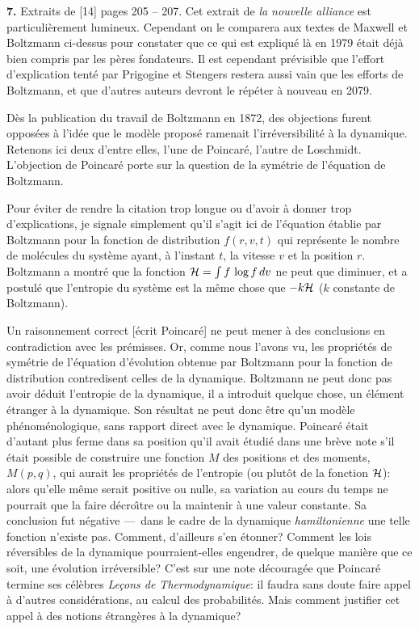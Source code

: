 \bigskip

{\bf 7.}\hskip3mm Extraits de [14] pages 205 -- 207. 
Cet extrait de {\it la nouvelle alliance} est particuli\`erement 
lumineux. Cependant on le comparera aux textes de Maxwell et 
Boltzmann ci-dessus pour constater que ce qui est expliqu\'e l\`a 
en 1979 \'etait d\'ej\`a bien compris par les p\`eres fondateurs. Il est 
cependant pr\'evisible que l'effort d'explication tent\'e par Prigogine et 
Stengers restera aussi vain que les efforts de Boltzmann, et que d'autres 
auteurs devront le r\'ep\'eter \`a nouveau en 2079. 
\medskip
{\cit D\`es la publication du travail de Boltzmann en {  1872},
des objections furent oppos\'ees \`a l'id\'ee que le mod\`ele propos\'e 
ramenait l'irr\'eversibilit\'e \`a la dynamique. Retenons ici deux d'entre 
elles, l'une de Poincar\'e, l'autre de Loschmidt. 
\smallskip
L'objection de Poincar\'e porte sur la question de la sym\'etrie de 
l'\'equation de Boltzmann. \par  }
\medskip
Pour \'eviter de rendre la citation trop longue ou d'avoir \`a donner trop 
d'explications, je signale simplement qu'il s'agit ici de l'\'equation 
\'etablie par Boltzmann pour la fonction de distribution $f(r,v,t)$ qui 
repr\'esente le nombre de mol\'ecules du syst\`eme ayant, \`a l'instant $t$, 
la vitesse $v$ et la position $r$. Boltzmann a montr\'e que la fonction 
${\cal H} = \int f\, \log f \, dv$ ne peut que diminuer, et a postul\'e 
que l'entropie du syst\`eme est la m\^eme chose que $-k{\cal H}$ ($k$ 
constante de Boltzmann). 
\medskip
{\cit  Un raisonnement correct [\'ecrit Poincar\'e] ne peut mener \`a des
conclusions en contradiction avec les pr\'emisses. Or, comme nous l'avons 
vu, les propri\'et\'es de sym\'etrie de l'\'equation d'\'evolution obtenue 
par Boltzmann pour la fonction de distribution contredisent celles de la 
dynamique. Boltzmann ne peut donc pas avoir d\'eduit l'entropie de la 
dynamique, il a introduit quelque chose, un \'el\'ement \'etranger \`a 
la dynamique. Son r\'esultat ne peut donc \^etre qu'un mod\`ele 
ph\'enom\'enologique, sans rapport direct avec le dynamique. 
\smallskip
Poincar\'e \'etait d'autant plus ferme dans sa position qu'il avait 
\'etudi\'e dans une br\`eve note s'il \'etait possible de construire une 
fonction $M$ des positions et des moments, $M(p,q)$, qui aurait les 
propri\'et\'es de l'entropie (ou plut\^ot de la fonction ${\cal H}$): 
alors qu'elle m\^eme serait positive ou nulle, sa variation au cours du 
temps ne pourrait que la faire d\'ecro{\^\i}tre ou la maintenir \`a une 
valeur constante. Sa conclusion fut n\'egative ---~dans le cadre de la 
dynamique {\it hamiltonienne} une telle fonction n'existe pas. Comment, 
d'ailleurs s'en \'etonner? Comment les lois r\'eversibles de la 
dynamique pourraient-elles engendrer, de quelque mani\`ere que ce 
soit, une \'evolution irr\'eversible? C'est sur une note d\'ecourag\'ee 
que Poincar\'e termine ses c\'el\`ebres {\it Le\c{c}ons de Thermodynamique}: 
il faudra sans doute faire appel \`a d'autres consid\'erations, au calcul 
des probabilit\'es. Mais comment justifier cet appel \`a des notions 
\'etrang\`eres \`a la dynamique? \par }
